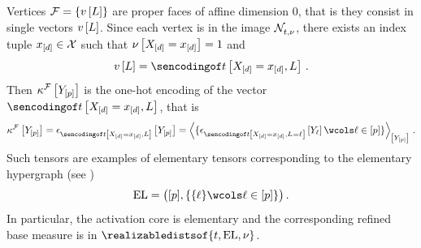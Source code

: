 \begin{example}[Vertices]
    \label{exa:vertexMeasures}
    Vertices $\mathcal{F}=\{v\left[L\right]\}$ are proper faces of affine dimension $0$, that is they consist in single vectors $v\left[L\right]$.
    Since each vertex is in the image $\mathcal{N}_{t,\nu}^{}$, there exists an index tuple $x_{[d]}\in\mathcal{X}$ such that $\nu\left[X_{[d]}=x_{[d]}\right]=1$ and
    \begin{align*}
        \imelementwith
        = \sencsstatat{\indexedshortcatvariables,\selvariable} \, .
    \end{align*}
    Then $\kappa^{\mathcal{F}}\left[Y_{[p]}\right]$ is the one-hot encoding of the vector $\sencsstatat{\indexedshortcatvariables,\selvariable}$, that is
    \begin{align*}
        \kcoreofat{\facesymbol}{\headvariables}
        = \onehotmapofat{\sencsstatat{\indexedshortcatvariables,\selvariable}}{\headvariables}
        = \contractionof{\{\onehotmapofat{\sencsstatat{\indexedshortcatvariables,\indexedselvariable}}{\headvariableof{\selindex}}\wcols\selindexin\}}{\headvariables}\, .
    \end{align*}
    Such tensors are examples of elementary tensors corresponding to the elementary hypergraph (see )
    \begin{align*}
        \elformat
        = \big([\seldim],\{\{\selindex\}\wcols\selindexin\}\big) \, .
    \end{align*}
    In particular, the activation core is elementary and the corresponding refined base measure is in $\realizabledistsof{\sstat,\elgraph,\basemeasure}$.
\end{example}